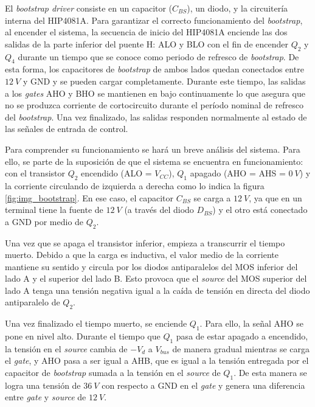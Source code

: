 El \textsl{bootstrap driver} consiste en un capacitor ($C_{BS}$), un diodo, y la circuitería interna del HIP4081A. Para garantizar el correcto funcionamiento del \textsl{bootstrap}, al encender el sistema, la secuencia de inicio del HIP4081A enciende las dos salidas de la parte inferior del puente H: ALO y BLO con el fin de encender $Q_2$ y $Q_4$ durante un tiempo que se conoce como periodo de refresco de \textsl{bootstrap}. De esta forma, los capacitores de \textsl{bootstrap} de ambos lados quedan conectados entre $12\:V$ y GND y se pueden cargar completamente. Durante este tiempo, las salidas a los \textsl{gates} AHO y BHO se mantienen en bajo continuamente lo que asegura que no se produzca corriente de cortocircuito durante el período nominal de refresco del \textsl{bootstrap}. Una vez finalizado, las salidas responden normalmente al estado de las señales de entrada de control.

Para comprender su funcionamiento se hará un breve análisis del sistema. Para ello, se parte de la suposición de que el sistema se encuentra en funcionamiento: con el transistor $Q_2$ encendido (ALO = $V_{CC}$), $Q_1$ apagado (AHO = AHS = $0\:V$) y la corriente circulando de izquierda a derecha como lo indica la figura \ref{fig:img_bootstrap}. En ese caso, el capacitor $C_{BS}$ se carga a $12\:V$, ya que en un terminal tiene la fuente de $12\:V$ (a través del diodo $D_{BS}$) y el otro está conectado a GND por medio de $Q_2$.

Una vez que se apaga el transistor inferior, empieza a transcurrir el tiempo muerto. Debido a que la carga es inductiva, el valor medio de la corriente mantiene su sentido y circula por los diodos antiparalelos del MOS inferior del lado A y el superior del lado B. Esto provoca que el \textsl{source} del MOS superior del lado A tenga una tensión negativa igual a la caída de tensión en directa del diodo antiparalelo de $Q_2$. 

Una vez finalizado el tiempo muerto, se enciende $Q_1$. Para ello, la señal AHO se pone en nivel alto. Durante el tiempo que $Q_1$ pasa de estar apagado a encendido, la tensión en el \textsl{source} cambia de $-V_d$ a $V_{bus}$ de manera gradual mientras se carga el \textsl{gate}, y AHO pasa a ser igual a AHB, que es igual a la tensión entregada por el capacitor de \textsl{bootstrap} sumada a la tensión en el \textsl{source} de $Q_1$. De esta manera se logra una tensión de $36\:V$ con respecto a GND en el \textsl{gate} y genera una diferencia entre \textsl{gate} y \textsl{source} de $12\:V$.

